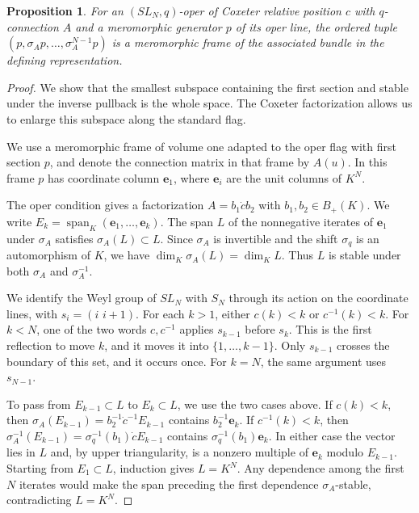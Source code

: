 \documentclass[11pt,leqno]{amsart}
\numberwithin{equation}{section}
\theoremstyle{plain}
\newtheorem{proposition}[theorem]{Proposition}
\theoremstyle{definition}
\theoremstyle{plain}
\theoremstyle{definition}
\theoremstyle{remark}
\begin{document}
\begin{proposition}\label{prop:typeA-cyclicity-from-reference-matching}
For an $(SL_N,q)$-oper of Coxeter relative position $c$ with $q$-connection $A$ and a meromorphic generator $p$ of its oper line, the ordered tuple $(p,\sigma_Ap,\ldots,\sigma_A^{N-1}p)$ is a meromorphic frame of the associated bundle in the defining representation.
\end{proposition}
\begin{proof}
We show that the smallest subspace containing the first section and stable under the inverse pullback is the whole space. The Coxeter factorization allows us to enlarge this subspace along the standard flag.

We use a meromorphic frame of volume one adapted to the oper flag with first section $p$, and denote the connection matrix in that frame by $A(u)$. In this frame $p$ has coordinate column $\mathbf e_1$, where $\mathbf e_i$ are the unit columns of $K^N$.

The oper condition gives a factorization $A=b_1\dot c b_2$ with $b_1,b_2\in B_+(K)$. We write $E_k=\operatorname{span}_K(\mathbf e_1,\ldots,\mathbf e_k)$.  The span $L$ of the nonnegative iterates of $\mathbf e_1$ under $\sigma_A$ satisfies $\sigma_A(L)\subset L$.  Since $\sigma_A$ is invertible and the shift $\sigma_q$ is an automorphism of $K$, we have $\dim_K\sigma_A(L)=\dim_KL$.  Thus $L$ is stable under both $\sigma_A$ and $\sigma_A^{-1}$.

We identify the Weyl group of $SL_N$ with $S_N$ through its action on the coordinate lines, with $s_i=(i\,\,i+1)$.  For each $k>1$, either $c(k)<k$ or $c^{-1}(k)<k$.  For $k<N$, one of the two words $c,c^{-1}$ applies $s_{k-1}$ before $s_k$.  This is the first reflection to move $k$, and it moves it into $\{1,\ldots,k-1\}$.  Only $s_{k-1}$ crosses the boundary of this set, and it occurs once.  For $k=N$, the same argument uses $s_{N-1}$.

To pass from $E_{k-1}\subset L$ to $E_k\subset L$, we use the two cases above.  If $c(k)<k$, then $\sigma_A(E_{k-1})=b_2^{-1}\dot c^{-1}E_{k-1}$ contains $b_2^{-1}\mathbf e_k$.  If $c^{-1}(k)<k$, then $\sigma_A^{-1}(E_{k-1})=\sigma_q^{-1}(b_1)\dot c E_{k-1}$ contains $\sigma_q^{-1}(b_1)\mathbf e_k$.  In either case the vector lies in $L$ and, by upper triangularity, is a nonzero multiple of $\mathbf e_k$ modulo $E_{k-1}$.  Starting from $E_1\subset L$, induction gives $L=K^N$.  Any dependence among the first $N$ iterates would make the span preceding the first dependence $\sigma_A$-stable, contradicting $L=K^N$.
\end{proof}
\end{document}

